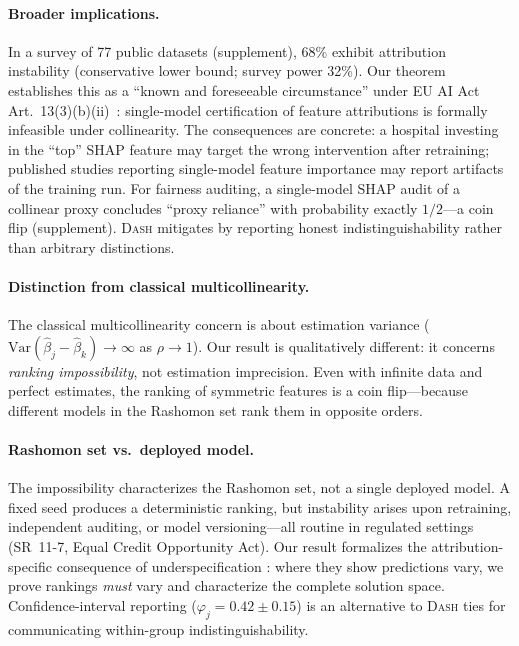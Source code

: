 \documentclass{article}
\newcommand{\Var}{\mathrm{Var}}
\newcommand{\DASH}{\textsc{Dash}}
\begin{document}

\paragraph{Broader implications.}
In a survey of 77 public datasets (supplement), 68\% exhibit attribution instability (conservative lower bound; survey power 32\%).
Our theorem establishes this as a ``known and foreseeable circumstance'' under EU AI Act Art.~13(3)(b)(ii)~\citep{euaiact2024}: single-model certification of feature attributions is formally infeasible under collinearity.
The consequences are concrete: a hospital investing in the ``top'' SHAP feature may target the wrong intervention after retraining; published studies reporting single-model feature importance may report artifacts of the training run.
For fairness auditing, a single-model SHAP audit of a collinear proxy concludes ``proxy reliance'' with probability exactly $1/2$---a coin flip (supplement).
\DASH{} mitigates by reporting honest indistinguishability rather than arbitrary distinctions.

\paragraph{Distinction from classical multicollinearity.}
The classical multicollinearity concern is about estimation variance ($\Var(\hat\beta_j - \hat\beta_k) \to \infty$ as $\rho \to 1$). Our result is qualitatively different: it concerns \emph{ranking impossibility}, not estimation imprecision. Even with infinite data and perfect estimates, the ranking of symmetric features is a coin flip---because different models in the Rashomon set rank them in opposite orders.

\paragraph{Rashomon set vs.\ deployed model.}
The impossibility characterizes the Rashomon set, not a single deployed model.
A fixed seed produces a deterministic ranking, but instability arises upon retraining, independent auditing, or model versioning---all routine in regulated settings (SR~11-7, Equal Credit Opportunity Act).
Our result formalizes the attribution-specific consequence of underspecification \citep{damour2022underspecification}: where they show predictions vary, we prove rankings \emph{must} vary and characterize the complete solution space.
Confidence-interval reporting ($\varphi_j = 0.42 \pm 0.15$) is an alternative to \DASH{} ties for communicating within-group indistinguishability.
\end{document}
